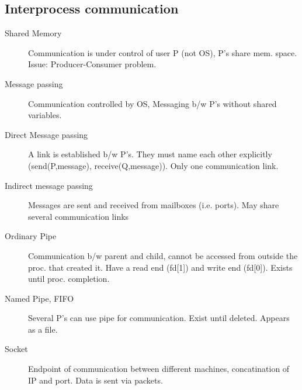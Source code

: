 \subsection*{Interprocess communication}
\begin{description}
  \item[Shared Memory]Communication is under control of user P (not OS), P's share mem. space. Issue: Producer-Consumer problem.
  \item[Message passing] Communication controlled by OS, Messaging b/w P's without shared variables.
  \item[Direct Message passing] A link is established b/w P's. They must name each other explicitly (send(P,message), receive(Q,message)). Only one communication link.
  \item[Indirect message passing] Messages are sent and received from mailboxes (i.e. ports). May share several communication links
  \item[Ordinary Pipe] Communication b/w parent and child, cannot be accessed from outside the proc. that created it. Have a read end (fd[1]) and write end (fd[0]). Exists until proc. completion.
  \item[Named Pipe, FIFO] Several P's can use pipe for communication. Exist until deleted. Appears as a file.
  \item[Socket] Endpoint of communication between different machines, concatination of IP and port. Data is sent via packets.
\end{description}
